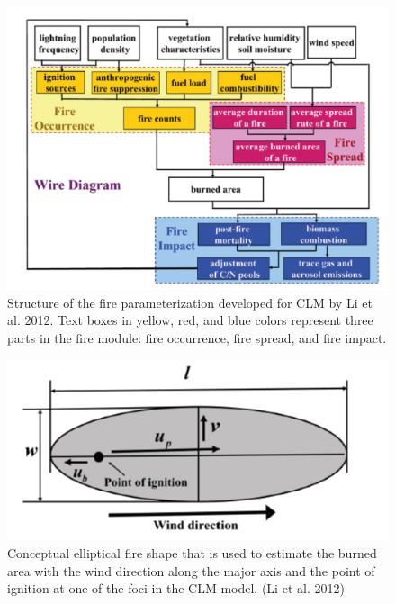 \documentclass[
  12pt,
  oneside]{book}
\begin{document}
\begin{figure}

{\centering \includegraphics[width=0.8\linewidth]{figures/chap8/f87_CLM_fire} 

}

\caption{Structure of the fire parameterization developed for CLM by Li et al. 2012. Text boxes in yellow, red, and blue colors represent three parts in the fire module: fire occurrence, fire spread, and fire impact.}\label{fig:f87}
\end{figure}

\begin{figure}

{\centering \includegraphics[width=0.8\linewidth]{figures/chap8/f88_fire_ellips} 

}

\caption{Conceptual elliptical fire shape that is used to estimate the burned area with the wind direction along the major axis and the point of ignition at one of the foci in the CLM model. (Li et al. 2012)}\label{fig:f88}
\end{figure}
\end{document}
